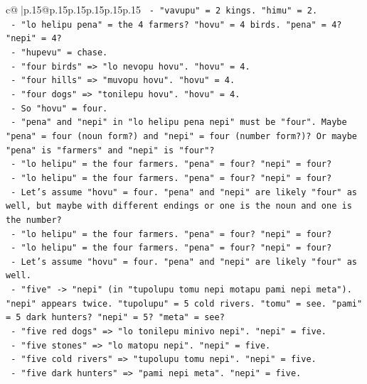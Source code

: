 \documentclass{article}
\begin{document}
{\begin{supertabular}{c@{$\;$}|p{.15\linewidth}@{}p{.15\linewidth}p{.15\linewidth}p{.15\linewidth}p{.15\linewidth}p{.15\linewidth}}
{{{\texttt{            {-} "vavupu" = 2 kings. "himu" = 2.} \\
\texttt{            {-} "lo helipu pena" = the 4 farmers? "hovu" = 4 birds. "pena" = 4? "nepi" = 4?} \\
\texttt{            {-} "hupevu" = chase.} \\
\texttt{            {-} "four birds" => "lo nevopu hovu". "hovu" = 4.} \\
\texttt{            {-} "four hills" => "muvopu hovu". "hovu" = 4.} \\
\texttt{            {-} "four dogs" => "tonilepu hovu". "hovu" = 4.} \\
\texttt{            {-} So "hovu" = four.} \\
\texttt{            {-} "pena" and "nepi" in "lo helipu pena nepi" must be "four". Maybe "pena" = four (noun form?) and "nepi" = four (number form?)? Or maybe "pena" is "farmers" and "nepi" is "four"?} \\
\texttt{            {-} "lo helipu" = the four farmers. "pena" = four? "nepi" = four?} \\
\texttt{            {-} "lo helipu" = the four farmers. "pena" = four? "nepi" = four?} \\
\texttt{            {-} Let's assume "hovu" = four. "pena" and "nepi" are likely "four" as well, but maybe with different endings or one is the noun and one is the number?} \\
\texttt{            {-} "lo helipu" = the four farmers. "pena" = four? "nepi" = four?} \\
\texttt{            {-} "lo helipu" = the four farmers. "pena" = four? "nepi" = four?} \\
\texttt{            {-} Let's assume "hovu" = four. "pena" and "nepi" are likely "four" as well.} \\
\texttt{            {-} "five" {-}> "nepi" (in "tupolupu tomu nepi motapu pami nepi meta"). "nepi" appears twice. "tupolupu" = 5 cold rivers. "tomu" = see. "pami" = 5 dark hunters? "nepi" = 5? "meta" = see?} \\
\texttt{            {-} "five red dogs" => "lo tonilepu minivo nepi". "nepi" = five.} \\
\texttt{            {-} "five stones" => "lo matopu nepi". "nepi" = five.} \\
\texttt{            {-} "five cold rivers" => "tupolupu tomu nepi". "nepi" = five.} \\
\texttt{            {-} "five dark hunters" => "pami nepi meta". "nepi" = five.} \\
}}}
\end{supertabular}}
\end{document}
